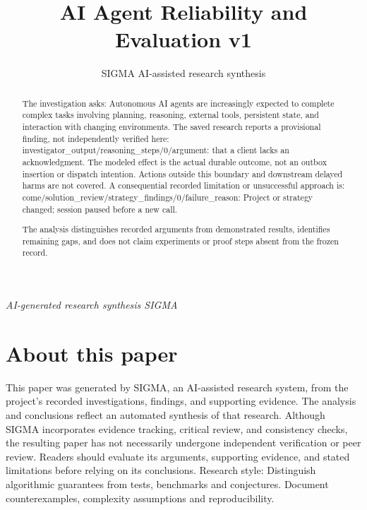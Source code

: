 \documentclass[11pt]{article}
\title{AI Agent Reliability and Evaluation v1}
\date{}
\author{SIGMA AI-assisted research synthesis}
\begin{document}
\maketitle
\begin{center}\end{center}
\begin{center}\small\textit{AI-generated research synthesis \textperiodcentered{} SIGMA}\end{center}

\begin{abstract}
The investigation asks: Autonomous AI agents are increasingly expected to complete complex tasks involving planning, reasoning, external tools, persistent state, and interaction with changing environments. The saved research reports a provisional finding, not independently verified here: investigator\_output/reasoning\_steps/0/argument: that a client lacks an acknowledgment. The modeled effect is the actual durable outcome, not an outbox insertion or dispatch intention. Actions outside this boundary and downstream delayed harms are not covered. A consequential recorded limitation or unsuccessful approach is: come/solution\_review/strategy\_findings/0/failure\_reason: Project or strategy changed; session paused before a new call.

The analysis distinguishes recorded arguments from demonstrated results, identifies remaining gaps, and does not claim experiments or proof steps absent from the frozen record.
\end{abstract}
\section*{About this paper}
This paper was generated by SIGMA, an AI-assisted research system, from the project's recorded investigations, findings, and supporting evidence.
The analysis and conclusions reflect an automated synthesis of that research. Although SIGMA incorporates evidence tracking, critical review, and consistency checks, the resulting paper has not necessarily undergone independent verification or peer review.
Readers should evaluate its arguments, supporting evidence, and stated limitations before relying on its conclusions.
Research style: Distinguish algorithmic guarantees from tests, benchmarks and conjectures. Document counterexamples, complexity assumptions and reproducibility.
\end{document}
